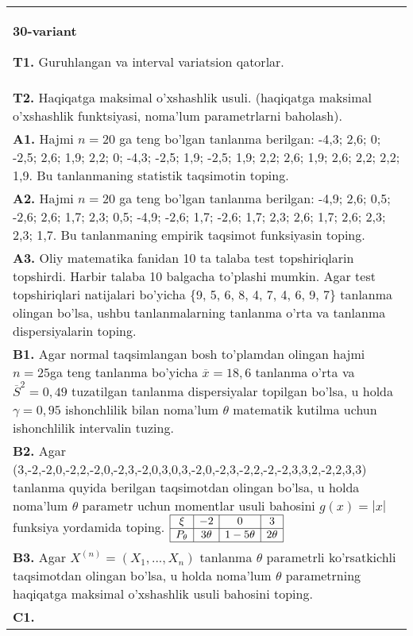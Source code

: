 \documentclass{article}
\begin{document}
\begin{tabular}{m{17cm}}
\textbf{30-variant}
\newline

\textbf{T1.} 
Guruhlangan va interval variatsion qatorlar.
\\
\textbf{T2.} 
Haqiqatga maksimal o'xshashlik usuli. (haqiqatga maksimal o'xshashlik funktsiyasi, noma'lum parametrlarni baholash).
\\
\textbf{A1.} 
Hajmi \(n = 20\) ga teng bo'lgan tanlanma berilgan: -4,3; 2,6; 0; -2,5; 2,6; 1,9; 2,2; 0; -4,3; -2,5; 1,9; -2,5; 1,9; 2,2; 2,6; 1,9; 2,6; 2,2; 2,2; 1,9. Bu tanlanmaning statistik taqsimotin toping.
\\
\textbf{A2.} 
Hajmi \(n = 20\) ga teng bo'lgan tanlanma berilgan: -4,9; 2,6; 0,5; -2,6; 2,6; 1,7; 2,3; 0,5; -4,9; -2,6; 1,7; -2,6; 1,7; 2,3; 2,6; 1,7; 2,6; 2,3; 2,3; 1,7. Bu tanlanmaning empirik taqsimot funksiyasin toping.
\\
\textbf{A3.} 
Oliy matematika fanidan 10 ta talaba test topshiriqlarin topshirdi. Harbir talaba 10 balgacha to'plashi mumkin. Agar test topshiriqlari natijalari bo'yicha \{9, 5, 6, 8, 4, 7, 4, 6, 9, 7\} tanlanma olingan bo'lsa, ushbu tanlanmalarning tanlanma o'rta va tanlanma dispersiyalarin toping.
\\
\textbf{B1.} 
Agar normal taqsimlangan bosh to'plamdan olingan hajmi \(n = 25\)ga teng tanlanma bo'yicha \(\overline{x} = 18,6\) tanlanma o'rta va \({\overline{S}}^{2} = 0,49\) tuzatilgan tanlanma dispersiyalar topilgan bo'lsa, u holda \(\gamma = 0,95\) ishonchlilik bilan noma'lum \(\theta\) matematik kutilma uchun ishonchlilik intervalin tuzing.
\\
\textbf{B2.} 
Agar (3,-2,-2,0,-2,2,-2,0,-2,3,-2,0,3,0,3,-2,0,-2,3,-2,2,-2,-2,3,3,2,-2,2,3,3) tanlanma quyida berilgan taqsimotdan olingan bo'lsa, u holda noma'lum \(\theta\) parametr uchun momentlar usuli bahosini \(g(x) = |x|\) funksiya yordamida toping.
$\begin{array}{|c|c|c|c|}
    \hline
    \xi & -2 & 0 & 3 \\
    \hline
    P_{\theta} & 3\theta & 1 - 5\theta & 2\theta \\
    \hline
\end{array}$
\\
\textbf{B3.} 
Agar \(X^{(n)} = \left( X_{1},...,X_{n} \right)\) tanlanma \(\theta\) parametrli ko'rsatkichli taqsimotdan olingan bo'lsa, u holda noma'lum \(\theta\) parametrning haqiqatga maksimal o'xshashlik usuli bahosini toping.
\\
\textbf{C1.} 

\end{tabular}
\end{document}
